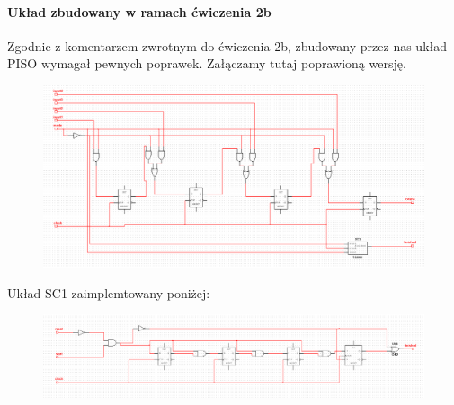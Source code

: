 \documentclass{article}
\begin{document}
\paragraph{Układ zbudowany w ramach ćwiczenia 2b}
Zgodnie z komentarzem zwrotnym do ćwiczenia 2b, zbudowany przez nas układ PISO wymagał pewnych poprawek. Załączamy tutaj poprawioną wersję.
\begin{figure}[H]
\includegraphics[width = \textwidth]{3b_2b_klaryfikacja}
\end{figure}
Układ SC1 zaimplemtowany poniżej:
\begin{figure}[H]
\includegraphics[width = \textwidth]{3b_SC1}
\end{figure}
\end{document}
